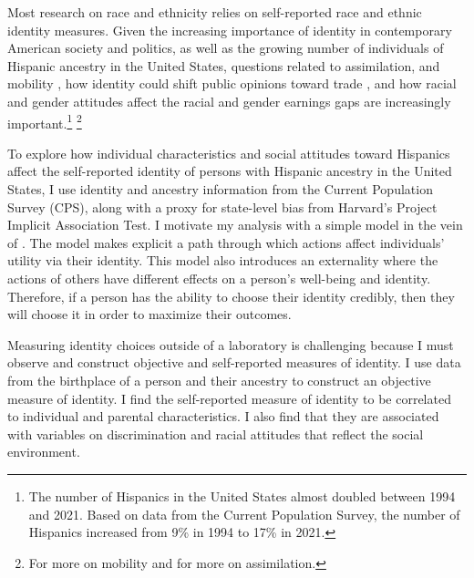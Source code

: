 \documentclass[12pt, fullpage]{article}
\begin{document}
Most research on race and ethnicity relies on self-reported race and ethnic identity measures. Given the increasing importance of identity in contemporary American society and politics, as well as the growing number of individuals of Hispanic ancestry in the United States, questions related to assimilation, and mobility \citep{chettyUnitedStatesStill2014,abramitzkyNationImmigrantsAssimilation2014}, how identity could shift public opinions toward trade \citep{grossmanIdentityPoliticsTrade2021}, and how racial and gender attitudes affect the racial and gender earnings gaps \citep{charlesPrejudiceWagesEmpirical2008,charlesEffectsSexismAmerican2018} are increasingly important.\footnote{The number of Hispanics in the United States almost doubled between 1994 and 2021. Based on data from the Current Population Survey, the number of Hispanics increased from 9\% in 1994 to 17\% in 2021.} \footnote{For more on mobility\citet{chettyEffectsExposureBetter2016,chettyFadingAmericanDream2017,chettyWhereLandOpportunity2014} and \citet{abramitzkyImmigrantsAssimilateMore2020a,abramitzkyCulturalAssimilationAge2016,chettyWhereLandOpportunity2014} for more on assimilation.}

To explore how individual characteristics and social attitudes toward Hispanics affect the self-reported identity of persons with Hispanic ancestry in the United States, I use identity and ancestry information from the Current Population Survey (CPS), along with a proxy for state-level bias from Harvard's Project Implicit Association Test. I motivate my analysis with a simple model in the vein of \citet{akerlofEconomicsIdentity2000}. The model makes explicit a path through which actions affect individuals' utility via their identity. This model also introduces an externality where the actions of others have different effects on a person's well-being and identity. Therefore, if a person has the ability to choose their identity credibly, then they will choose it in order to maximize their outcomes.

Measuring identity choices outside of a laboratory is challenging because I must observe and construct objective and self-reported measures of identity. I use data from the birthplace of a person and their ancestry to construct an objective measure of identity. I find the self-reported measure of identity to be correlated to individual and parental characteristics. I also find that they are associated with variables on discrimination and racial attitudes that reflect the social environment. 
\end{document}
